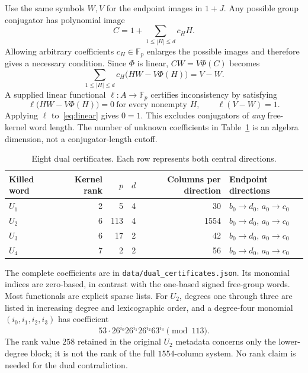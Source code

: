 \documentclass[11pt,a4paper]{article}
\theoremstyle{definition}\newtheorem{definition}[theorem]{Definition}
\theoremstyle{remark}\newtheorem{remark}[theorem]{Remark}
\newcommand{\pathfile}[1]{\nolinkurl{#1}}
\begin{document}
Use the same symbols $W,V$ for the endpoint images in $1+J$. Any possible group conjugator has polynomial image
\[
 C=1+\sum_{1\le|H|\le d}c_H H.
\]
Allowing arbitrary coefficients $c_H\in\mathbb F_p$ enlarges the possible images and therefore gives a necessary condition. Since $\Phi$ is linear, $CW=V\Phi(C)$ becomes
\begin{equation}\label{eq:linear}
 \sum_{1\le|H|\le d}c_H\bigl(HW-V\Phi(H)\bigr)=V-W.
\end{equation}
A supplied linear functional $\ell:A\to\mathbb F_p$ certifies inconsistency by satisfying
\[
 \ell\bigl(HW-V\Phi(H)\bigr)=0\ \text{for every nonempty }H,
 \qquad \ell(V-W)=1.
\]
Applying $\ell$ to~\eqref{eq:linear} gives $0=1$. This excludes conjugators of \emph{any} free-kernel word length. The number of unknown coefficients in Table~\ref{tab:dual} is an algebra dimension, not a conjugator-length cutoff.

\begin{table}[H]\centering
\caption{Eight dual certificates. Each row represents both central directions.}\label{tab:dual}
\begin{tabular}{lrrrrl}\toprule
Killed word & Kernel rank & $p$ & $d$ & Columns per direction & Endpoint directions\\\midrule
$U_1$&2&5&4&30& $b_0\to d_0$, $a_0\to c_0$\\
$U_2$&6&113&4&1554& $b_0\to d_0$, $a_0\to c_0$\\
$U_3$&6&17&2&42& $b_0\to d_0$, $a_0\to c_0$\\
$U_4$&7&2&2&56& $b_0\to d_0$, $a_0\to c_0$\\\bottomrule
\end{tabular}
\end{table}

The complete coefficients are in \pathfile{data/dual_certificates.json}. Its monomial indices are zero-based, in contrast with the one-based signed free-group words. Most functionals are explicit sparse lists. For $U_2$, degrees one through three are listed in increasing degree and lexicographic order, and a degree-four monomial $(i_0,i_1,i_2,i_3)$ has coefficient
\[
53\cdot26^{i_0}26^{i_1}26^{i_2}63^{i_3}\pmod{113}.
\]
The rank value $258$ retained in the original $U_2$ metadata concerns only the lower-degree block; it is not the rank of the full $1554$-column system. No rank claim is needed for the dual contradiction.
\end{document}
